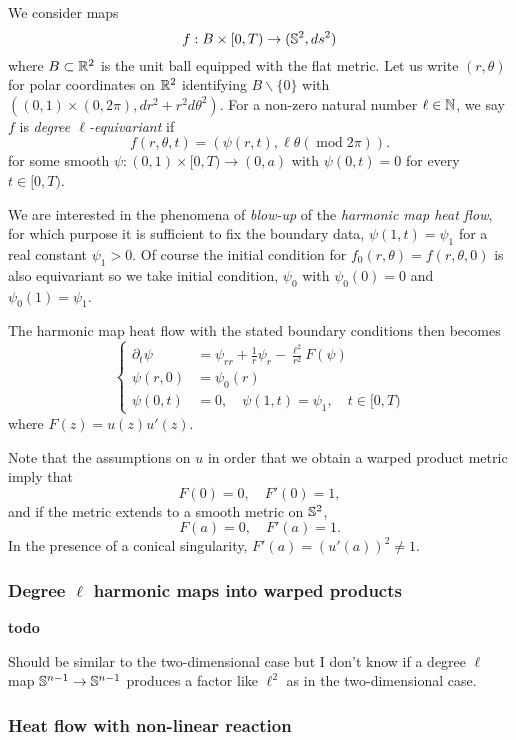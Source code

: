 \documentclass{amsart}
\begin{document}
We consider maps
\[
f : B \times [0, T) \to (\S^2, ds^2)
\]
where $B \subset \R^2$ is the unit ball equipped with the flat metric. Let us write $(r, \theta)$ for polar coordinates on $\R^2$ identifying $B \backslash \{0\}$ with $((0, 1) \times (0, 2\pi), dr^2 + r^2 d\theta^2)$. For a non-zero natural number \(\ell \in \N\), we say $f$ is \emph{degree $\ell$-equivariant} if
\[
f (r, \theta, t) = (\psi(r, t), \ell\theta (\operatorname{mod} 2\pi)).
\]
for some smooth $\psi : (0, 1) \times [0, T) \to (0, a)$ with \(\psi(0, t) = 0\) for every \(t \in [0, T)\).

We are interested in the phenomena of \emph{blow-up} of the \emph{harmonic map heat flow}, for which purpose it is sufficient to fix the boundary data, \(\psi(1, t) = \psi_1\) for a real constant \(\psi_1 > 0\). Of course the initial condition for \(f_0(r, \theta) = f(r, \theta, 0)\) is also equivariant so we take initial condition, \(\psi_0\) with \(\psi_0(0) = 0\) and \(\psi_0(1) = \psi_1\).

The harmonic map heat flow with the stated boundary conditions then becomes
\begin{equation}
\label{eq:harmonic_map_heat_flow}
\begin{cases}
\partial_t \psi &= \psi_{rr} + \frac{1}{r} \psi_r - \frac{\ell^2}{r^2} F(\psi) \\
\psi(r, 0) &= \psi_0(r) \\
\psi(0, t) &= 0, \quad \psi(1, t) = \psi_1, \quad t \in [0, T)
\end{cases}
\end{equation}
where \(F(z) = u(z)u'(z)\).

Note that the assumptions on \(u\) in order that we obtain a warped product metric imply that
\[
F(0) = 0, \quad F'(0) = 1,
\]
and if the metric extends to a smooth metric on \(\S^2\),
\[
F(a) = 0, \quad F'(a) = 1.
\]
In the presence of a conical singularity, \(F'(a) = (u'(a))^2 \ne 1\).

\subsubsection*{Degree \(\ell\) harmonic maps into warped products}

\textbf{todo}

Should be similar to the two-dimensional case but I don't know if a degree \(\ell\) map \(\S^{n-1} \to \S^{n-1}\) produces a factor like \(\ell^2\) as in the two-dimensional case.

\subsubsection*{Heat flow with non-linear reaction}
\end{document}
